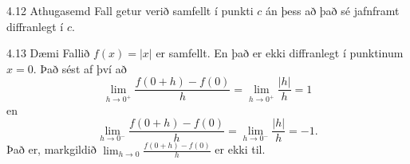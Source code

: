 \documentclass[icelandic,a4paper,12pt]{article}
\begin{document}
\begin{frame}
\begin{block}{4.12 Athugasemd}
 Fall getur verið samfellt í punkti $c$ án þess að það sé
jafnframt diffranlegt í $c$.
\end{block}
\pause

\begin{block}{4.13 Dæmi} Fallið $f(x) = |x|$ er samfellt. En það er ekki diffranlegt í 
punktinum $x=0$. \pause Það sést af því að
$$
\lim_{h\to 0^+} \frac{f(0+h)-f(0)}{h} = \lim_{h\to 0^+} \frac{|h|}{h}
= 1
$$
\pause
en
$$
\lim_{h\to 0^-} \frac{f(0+h)-f(0)}{h} = \lim_{h\to 0^-} \frac{|h|}{h}
= -1.
$$
\pause
Það er, markgildið $\lim_{h\to 0} \frac{f(0+h)-f(0)}{h}$ er ekki til.

 \end{block}
\end{frame}
\end{document}
